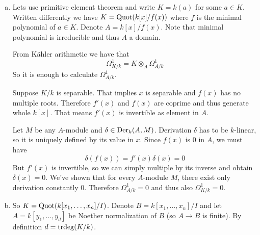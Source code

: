 \begin{exercise}{2}
    \begin{enumerate}[a)]
        \item{
                Lets use primitive element theorem and write $K = k(a)$ for some $a
                \in K$.
                Written differently we have $K = \operatorname{Quot}(k[x]/f(x))$ where $f$ is
                the minimal polynomial of $a \in K$.
                Denote $A = k[x]/f(x)$.
                Note that minimal polynomial is irreducible and thus $A$ a domain.

                From Kähler arithmetic we have that
                \begin{equation*}
                    \Omega^1_{K/k} = K \otimes_A \Omega^1_{A/k}
                \end{equation*}
                So it is enough to calculate $\Omega^1_{A/k}$.

                Suppose $K/k$ is separable. That implies $x$ is separable and
                $f(x)$ has no multiple roots. Therefore $f'(x)$ and $f(x)$ are
                coprime and thus generate whole $k[x]$. That means $f'(x)$ is
                invertible as element in $A$.

                Let $M$ be any $A$-module and $\delta \in \operatorname{Der}_k(A, M)$.
                Derivation $\delta$ has to be $k$-linear, so it is uniquely
                defined by its value in $x$.
                Since $f(x)$ is $0$ in $A$, we must have
                \begin{equation*}
                    \delta(f(x)) = f'(x) \delta(x) = 0
                \end{equation*}
                But $f'(x)$ is invertible, so we can simply multiple by its
                inverse and obtain $\delta(x) = 0$.
                We've shown that for every $A$-module $M$, there exist only
                derivation constantly $0$. Therefore $\Omega^1_{A/k} = 0$ and
                thus also $\Omega^1_{K/k} = 0$.

            }
        \item{
                So $K = \operatorname{Quot}(k[x_1, \dots, x_n] / I)$.
                Denote $B = k[x_1, \dots, x_n] / I$ and let $A = k[y_1, \dots,
                y_d]$ be Noether normalization of $B$ (so $A \to B$ is finite).
                By definition $d = \operatorname{trdeg}(K/k)$.

}
\end{enumerate}
\end{exercise}
